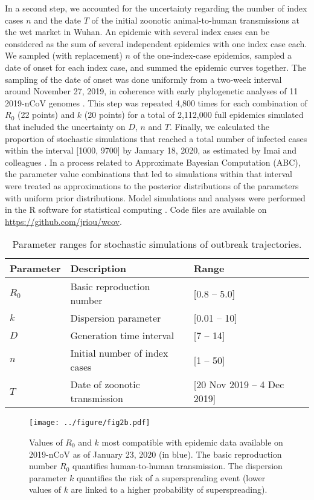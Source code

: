 \documentclass{article}
\begin{document}
In a second step, we accounted for the uncertainty regarding the number of index cases $n$ and the date $T$ of the initial zoonotic animal-to-human transmissions at the wet market in Wuhan. 
An epidemic with several index cases can be considered as the sum of several independent epidemics with one index case each.
We sampled (with replacement) $n$ of the one-index-case epidemics, sampled a date of onset for each index case, and summed the epidemic curves together.
The sampling of the date of onset was done uniformly from a two-week interval around November 27, 2019, in coherence with early phylogenetic analyses of 11 2019-nCoV genomes \cite{Rambaut:2020}.
This step was repeated 4,800 times for each combination of $R_0$ (22 points) and $k$ (20 points) for a total of 2,112,000 full epidemics simulated that included the uncertainty on $D$, $n$ and $T$.
Finally, we calculated the proportion of stochastic simulations that reached a total number of infected cases within the interval [1000, 9700] by January 18, 2020, as estimated by Imai and colleagues \cite{Imai:2020}.
In a process related to Approximate Bayesian Computation (ABC), the parameter value combinations that led to simulations within that interval were treated as approximations to the posterior distributions of the parameters with uniform prior distributions.
Model simulations and analyses were performed in the R software for statistical computing \cite{R:2018}.
Code files are available on \url{https://github.com/jriou/wcov}.

\begin{table}
	\centering
	\caption{Parameter ranges for stochastic simulations of outbreak trajectories.}
	\label{fig:tab1}
\begin{tabular}{llll}
	\hline
	Parameter & Description & Range   \\
	\hline 
	$R_0$& Basic reproduction number  &[0.8 -- 5.0] \\ 
	$k$ & Dispersion parameter & [0.01 -- 10] \\
	$D$ & Generation time interval & [7 -- 14]  \\
	$n$ & Initial number of index cases & [1 -- 50]  \\
	$T$ & Date of zoonotic transmission & [20 Nov 2019 -- 4 Dec 2019] \\
	
	\hline 
\end{tabular} 
\end{table}

\begin{figure}[b]
	\centering
	\texttt{[image: ../figure/fig2b.pdf]}
	\caption{Values of $R_0$ and $k$ most compatible with epidemic data available on 2019-nCoV as of January 23, 2020 (in blue). The basic reproduction number $R_0$ quantifies human-to-human transmission. The dispersion parameter $k$ quantifies the risk of a superspreading event (lower values of $k$ are linked to a higher probability of superspreading).}
	\label{fig:fig2}
\end{figure}
\end{document}
